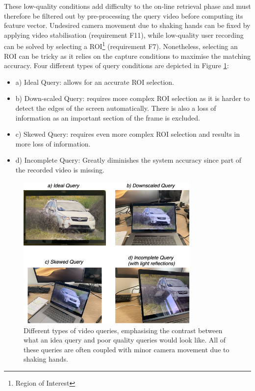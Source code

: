 These low-quality conditions add difficulty to the on-line retrieval phase and must therefore be filtered out by pre-processing the query video before computing its feature vector. Undesired camera movement due to shaking hands can be fixed by applying video stabilisation (requirement F11), while low-quality user recording can be solved by selecting a ROI\footnote{Region of Interest} (requirement F7). Nonetheless, selecting an ROI can be tricky as it relies on the capture conditions to maximise the matching accuracy. Four different types of query conditions are depicted in Figure \ref{fig:difference-query-video-issues}:
\begin{itemize}
    \item a) Ideal Query: allows for an accurate ROI selection.
    \item b) Down-scaled Query: requires more complex ROI selection as it is harder to detect the edges of the screen automatically. There is also a loss of information as an important section of the frame is excluded.
    \item c) Skewed Query: requires even more complex ROI selection and results in more loss of information.
    \item d) Incomplete Query: Greatly diminishes the system accuracy since part of the recorded video is missing.
\end{itemize}

\begin{figure}[h]
\centerline{\includegraphics[width=0.8\textwidth]{figures/design/difference-query-video-issues.png}}
\caption{\label{fig:difference-query-video-issues}Different types of video queries, emphasising the contrast between what an idea query and poor quality queries would look like. All of these queries are often coupled with minor camera movement due to shaking hands.}
\end{figure}

